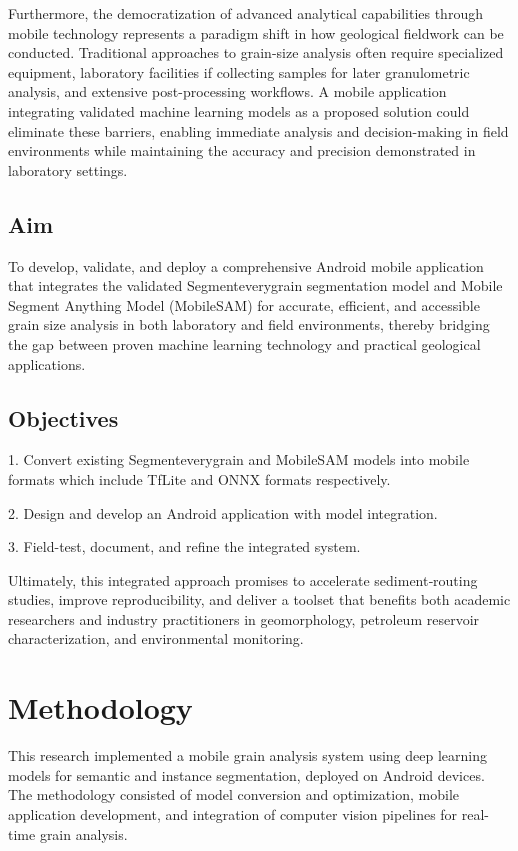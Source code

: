 \documentclass[final-report]{report-template}
\begin{document}
Furthermore, the democratization of advanced analytical capabilities through mobile technology represents a paradigm shift in how geological fieldwork can be conducted. Traditional approaches to grain-size analysis often require specialized equipment, laboratory facilities if collecting samples for later granulometric analysis, and extensive post-processing workflows. A mobile application integrating validated machine learning models as a proposed solution could eliminate these barriers, enabling immediate analysis and decision-making in field environments while maintaining the accuracy and precision demonstrated in laboratory settings.

\subsection{Aim}
To develop, validate, and deploy a comprehensive Android mobile application that integrates the validated Segmenteverygrain segmentation model and Mobile Segment Anything Model (MobileSAM) for accurate, efficient, and accessible grain size analysis in both laboratory and field environments, thereby bridging the gap between proven machine learning technology and practical geological applications.

\subsection{Objectives}
1. Convert existing Segmenteverygrain and MobileSAM models into mobile formats which include TfLite and ONNX formats respectively.

2. Design and develop an Android application with model integration.

3. Field-test, document, and refine the integrated system.

Ultimately, this integrated approach promises to accelerate sediment‐routing studies, improve reproducibility, and deliver a toolset that benefits both academic researchers and industry practitioners in geomorphology, petroleum reservoir characterization, and environmental monitoring.

\section{Methodology}
This research implemented a mobile grain analysis system using deep learning models for semantic and instance segmentation, deployed on Android devices. The methodology consisted of model conversion and optimization, mobile application development, and integration of computer vision pipelines for real-time grain analysis.
\end{document}
